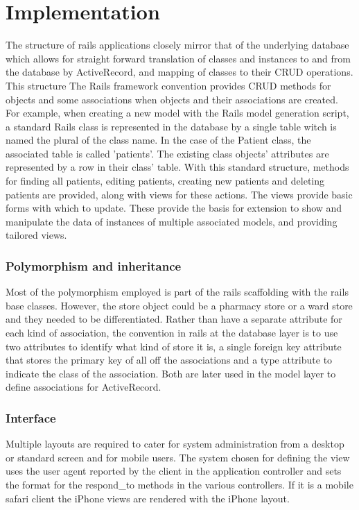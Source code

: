 \documentclass[letterpaper]{amsart}
\begin{document}
\part{Implementation}
The structure of rails applications closely mirror that of the underlying database which allows for straight forward translation of classes and instances to and from the database by ActiveRecord, and mapping of classes to their CRUD operations.   This structure
The Rails framework convention provides CRUD methods for objects and some associations when objects and their associations are created.  For example, when creating a new model with the Rails model generation script, a standard Rails class is represented in the database by a single table witch is named the plural of the class name.  In the case of the Patient class, the associated table is called 'patients'.  The existing class objects' attributes are represented by a row in their class' table.  With this standard structure, methods for finding all patients, editing patients, creating new patients and deleting patients are provided, along with views for these actions.  The views provide basic forms with which to update.  These provide the basis for extension to show and manipulate the data of instances of multiple associated models, and providing tailored views. 
\section{Polymorphism and inheritance}
Most of the polymorphism employed is part of the rails scaffolding with the rails base classes.  However, the store object could be a pharmacy store or a ward store and they needed to be differentiated.  Rather than have a separate attribute for each kind of association, the convention in rails at the database layer is to use two attributes to identify what kind of store it is, a single foreign key attribute that stores the primary key of all off the associations and a type attribute to indicate the class of the association.  Both are later used in the model layer to define associations for ActiveRecord.
\section{Interface}
Multiple layouts are required to cater for system administration from a desktop or standard screen and for mobile users.  The system chosen for defining the view uses the user agent reported by the client in the application controller and sets the format for the respond\_to methods in the various controllers.  If it is a mobile safari client the iPhone views are rendered with the iPhone layout.  
\end{document}
